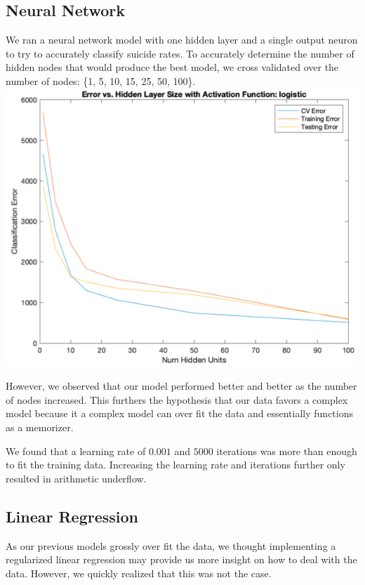 \documentclass{article}
\begin{document}
\begin{multicols}{2}
\subsection{Neural Network} We ran a neural network model with one hidden layer and a single output neuron to try to accurately classify suicide rates. To accurately determine the number of hidden nodes that would produce the best model, we cross validated over the number of nodes: \{1, 5, 10, 15, 25, 50, 100\}. 
\begingroup
    \includegraphics[width=\columnwidth]{neur-net.png}
    \begin{spacing}{1.2}
    \label{fig:neural_net_fig} 
	\end{spacing}
\endgroup


However, we observed that our model performed better and better as the number of nodes increased. This furthers the hypothesis that our data favors a complex model because it a complex model can over fit the data and essentially functions as a memorizer. 

We found that a learning rate of $0.001$ and $5000$ iterations was more than enough to fit the training data. Increasing the learning rate and iterations further only resulted in arithmetic underflow. 

\subsection{Linear Regression} As our previous models grossly over fit the data, we thought implementing a regularized linear regression may provide us more insight on how to deal with the data. However, we quickly realized that this was not the case.


\end{multicols}
\end{document}
